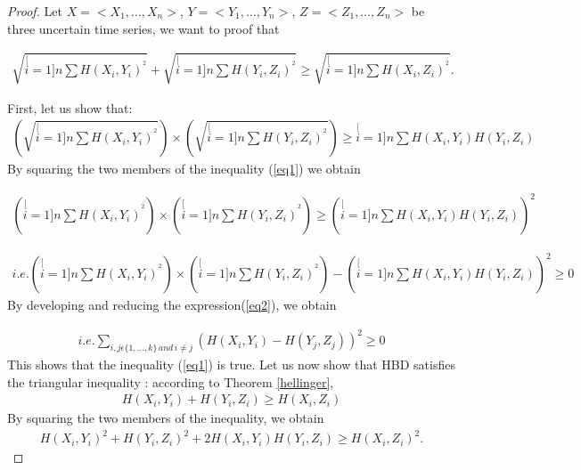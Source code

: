 \begin{proof}
Let $X=<X_1, \ldots,X_n>$, $Y=<Y_1, \ldots,Y_n>$, $Z=<Z_1, \ldots,Z_n>$ be three uncertain time series, we want to proof that

\begin{eqnarray}
\sqrt{\stackrel[i=1]{n}{\sum}H(X_{i},Y_{i})^{^{2}}}
+
\sqrt{\stackrel[i=1]{n}{\sum}H(Y_{i},Z_{i})^{^{2}}}
\geq
\sqrt{\stackrel[i=1]{n}{\sum}H(X_{i},Z_{i})^{^{2}}}.
\end{eqnarray} 


First, let us show that:
\begin{eqnarray}
\left( \sqrt{\stackrel[i=1]{n}{\sum}H(X_{i},Y_{i})^{^{2}} }\right)
\times
\left( \sqrt{\stackrel[i=1]{n}{\sum}H(Y_{i},Z_{i})^{^{2}}} \right)
\geq
\stackrel[i=1]{n}{\sum}H(X_{i},Y_{i})H(Y_{i},Z_{i})
\label{eq1}
\end{eqnarray}
By squaring the two members of the inequality (\ref{eq1}) we obtain

\begin{eqnarray}
\left( \stackrel[i=1]{n}{\sum}H(X_{i},Y_{i})^{^{2}} \right)
\times
\left( \stackrel[i=1]{n}{\sum}H(Y_{i},Z_{i})^{^{2}} \right)
\geq
\left( \stackrel[i=1]{n}{\sum}H(X_{i},Y_{i})H(Y_{i},Z_{i}) \right)^2
\end{eqnarray}

\begin{eqnarray}
i.e.
\left( \stackrel[i=1]{n}{\sum}H(X_{i},Y_{i})^{^{2}} \right)
\times
\left( \stackrel[i=1]{n}{\sum}H(Y_{i},Z_{i})^{^{2}} \right)
-
\left( \stackrel[i=1]{n}{\sum}H(X_{i},Y_{i})H(Y_{i},Z_{i}) \right)^2
\geq
0
\label{eq2}
\end{eqnarray}
By developing and reducing the expression(\ref{eq2}), we obtain

\begin{eqnarray}
i.e.
\underset{i,j\epsilon\{1,...,k\}\,and\,i\neq j}{\sum}\left(H(X_{i},Y_{i})-H(Y_{j},Z_{j})\right)^{2}
\geq
0
\end{eqnarray}
This shows that the inequality (\ref{eq1}) is true.
Let us now show that HBD satisfies the triangular inequality : 
according to Theorem \ref{hellinger}, 
\begin{eqnarray}
H(X_{i},Y_{i})+H(Y_{i},Z_{i})\geq H(X_{i},Z_{i})
\end{eqnarray}
By squaring the two members of the inequality, we obtain
\begin{eqnarray}
H(X_{i},Y_{i})^2+H(Y_{i},Z_{i})^2 + 2H(X_i, Y_i)H(Y_i, Z_i)\geq
H(X_{i},Z_{i})^2.
\end{eqnarray}


\end{proof}
